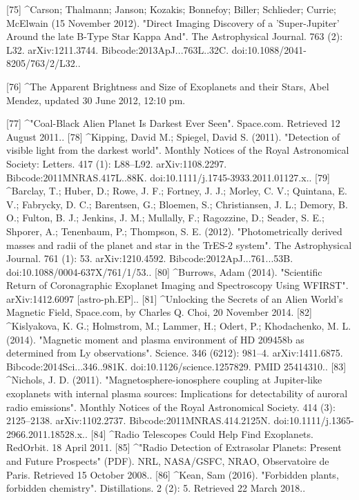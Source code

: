 [75]
^Carson; Thalmann; Janson; Kozakis; Bonnefoy; Biller; Schlieder; Currie; McElwain (15 November 2012). "Direct Imaging Discovery of a 'Super-Jupiter' Around the late B-Type Star Kappa And". The Astrophysical Journal. 763 (2): L32. arXiv:1211.3744. Bibcode:2013ApJ...763L..32C. doi:10.1088/2041-8205/763/2/L32..

[76]
^The Apparent Brightness and Size of Exoplanets and their Stars, Abel Mendez, updated 30 June 2012, 12:10 pm.

[77]
^"Coal-Black Alien Planet Is Darkest Ever Seen". Space.com. Retrieved 12 August 2011..
[78]
^Kipping, David M.; Spiegel, David S. (2011). "Detection of visible light from the darkest world". Monthly Notices of the Royal Astronomical Society: Letters. 417 (1): L88–L92. arXiv:1108.2297. Bibcode:2011MNRAS.417L..88K. doi:10.1111/j.1745-3933.2011.01127.x..
[79]
^Barclay, T.; Huber, D.; Rowe, J. F.; Fortney, J. J.; Morley, C. V.; Quintana, E. V.; Fabrycky, D. C.; Barentsen, G.; Bloemen, S.; Christiansen, J. L.; Demory, B. O.; Fulton, B. J.; Jenkins, J. M.; Mullally, F.; Ragozzine, D.; Seader, S. E.; Shporer, A.; Tenenbaum, P.; Thompson, S. E. (2012). "Photometrically derived masses and radii of the planet and star in the TrES-2 system". The Astrophysical Journal. 761 (1): 53. arXiv:1210.4592. Bibcode:2012ApJ...761...53B. doi:10.1088/0004-637X/761/1/53..
[80]
^Burrows, Adam (2014). "Scientific Return of Coronagraphic Exoplanet Imaging and Spectroscopy Using WFIRST". arXiv:1412.6097 [astro-ph.EP]..
[81]
^Unlocking the Secrets of an Alien World's Magnetic Field, Space.com, by Charles Q. Choi, 20 November 2014.
[82]
^Kislyakova, K. G.; Holmstrom, M.; Lammer, H.; Odert, P.; Khodachenko, M. L. (2014). "Magnetic moment and plasma environment of HD 209458b as determined from Ly observations". Science. 346 (6212): 981–4. arXiv:1411.6875. Bibcode:2014Sci...346..981K. doi:10.1126/science.1257829. PMID 25414310..
[83]
^Nichols, J. D. (2011). "Magnetosphere-ionosphere coupling at Jupiter-like exoplanets with internal plasma sources: Implications for detectability of auroral radio emissions". Monthly Notices of the Royal Astronomical Society. 414 (3): 2125–2138. arXiv:1102.2737. Bibcode:2011MNRAS.414.2125N. doi:10.1111/j.1365-2966.2011.18528.x..
[84]
^Radio Telescopes Could Help Find Exoplanets. RedOrbit. 18 April 2011.
[85]
^"Radio Detection of Extrasolar Planets: Present and Future Prospects" (PDF). NRL, NASA/GSFC, NRAO, Observatoìre de Paris. Retrieved 15 October 2008..
[86]
^Kean, Sam (2016). "Forbidden plants, forbidden chemistry". Distillations. 2 (2): 5. Retrieved 22 March 2018..
